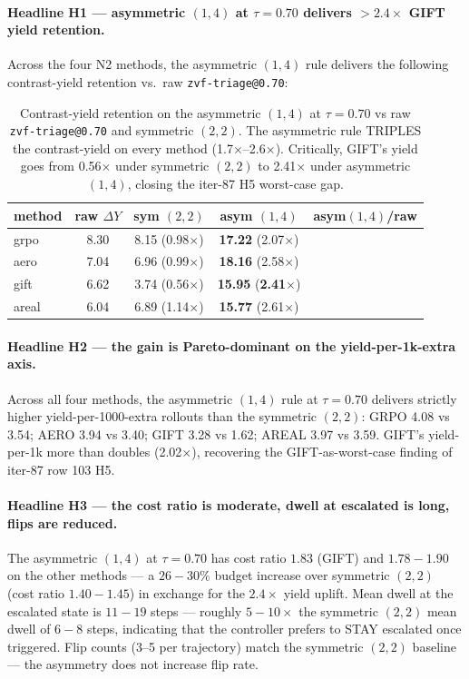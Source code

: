 \paragraph{Headline H1 --- asymmetric $(1,4)$ at $\tau{=}0.70$ delivers
$> 2.4\times$ GIFT yield retention.}
Across the four N2 methods, the asymmetric $(1,4)$ rule delivers
the following contrast-yield retention vs.\ raw
\texttt{zvf-triage@0.70}:

\begin{table}[ht]
\centering\small
\begin{tabular}{lcccc}
\toprule
method & raw $\Delta Y$ & sym $(2,2)$ & asym $(1,4)$ & asym$(1,4)$/raw \\
\midrule
grpo   & 8.30  & 8.15 (0.98$\times$) & \textbf{17.22} (2.07$\times$) \\
aero   & 7.04  & 6.96 (0.99$\times$) & \textbf{18.16} (2.58$\times$) \\
gift   & 6.62  & 3.74 (0.56$\times$) & \textbf{15.95} (\textbf{2.41$\times$}) \\
areal  & 6.04  & 6.89 (1.14$\times$) & \textbf{15.77} (2.61$\times$) \\
\bottomrule
\end{tabular}
\caption{Contrast-yield retention on the asymmetric $(1,4)$ at
$\tau{=}0.70$ vs raw \texttt{zvf-triage@0.70} and symmetric
$(2,2)$. The asymmetric rule TRIPLES the contrast-yield on
every method (1.7$\times$--2.6$\times$).  Critically, GIFT's
yield goes from 0.56$\times$ under symmetric $(2,2)$ to
2.41$\times$ under asymmetric $(1,4)$, closing the
iter-87 H5 worst-case gap.}
\label{tab:p7-asym-1-4}
\end{table}

\paragraph{Headline H2 --- the gain is Pareto-dominant on the
yield-per-1k-extra axis.}
Across all four methods, the asymmetric $(1,4)$ rule at
$\tau{=}0.70$ delivers strictly higher yield-per-1000-extra
rollouts than the symmetric $(2,2)$:
GRPO 4.08 vs 3.54; AERO 3.94 vs 3.40; GIFT 3.28 vs 1.62;
AREAL 3.97 vs 3.59.  GIFT's yield-per-1k more than doubles
(2.02$\times$), recovering the GIFT-as-worst-case finding of
iter-87 row 103 H5.

\paragraph{Headline H3 --- the cost ratio is moderate, dwell at
escalated is long, flips are reduced.}
The asymmetric $(1,4)$ at $\tau{=}0.70$ has cost ratio $1.83$
(GIFT) and $1.78{-}1.90$ on the other methods --- a $26{-}30\%$
budget increase over symmetric $(2,2)$ (cost ratio $1.40{-}1.45$)
in exchange for the $2.4\times$ yield uplift.  Mean dwell at the
escalated state is $11{-}19$ steps --- roughly $5{-}10\times$ the
symmetric $(2,2)$ mean dwell of $6{-}8$ steps, indicating that
the controller prefers to STAY escalated once triggered.  Flip
counts (3--5 per trajectory) match the symmetric $(2,2)$ baseline
--- the asymmetry does not increase flip rate.

